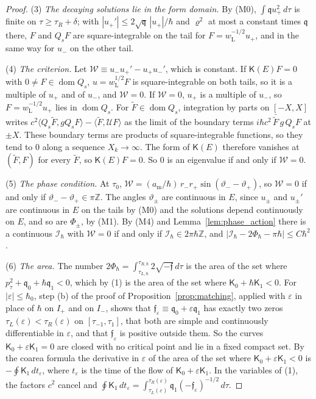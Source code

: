 \documentclass[aps,prd,onecolumn,tightenlines,nofootinbib,notitlepage,11pt,floatfix]{revtex4-2}
\theoremstyle{indentedtheorem}
\begin{document}
\begin{proof}
(3) \emph{The decaying solutions lie in the form domain.} By (M0), $\int\mathfrak{q}u_+^2\,d\tau$ is finite on $\tau\geq\tau_R+\delta$; with $|u_+'|\leq2\sqrt{\mathfrak{q}}\,|u_+|/\hbar$ and $\varrho^2$ at most a constant times $\mathfrak{q}$ there, $F$ and $Q_sF$ are square-integrable on the tail for $F=w_\text{L}^{-1/2}u_+$, and in the same way for $u_-$ on the other tail.

(4) \emph{The criterion.} Let $\mathcal{W}\equiv u_-u_+'-u_+u_-'$, which is constant. If $\mathsf{K}(E)F=0$ with $0\neq F\in\operatorname{dom}Q_s$, $u=w_\text{L}^{1/2}F$ is square-integrable on both tails, so it is a multiple of $u_+$ and of $u_-$, and $\mathcal{W}=0$. If $\mathcal{W}=0$, $u_+$ is a multiple of $u_-$, so $F=w_\text{L}^{-1/2}u_+$ lies in $\operatorname{dom}Q_s$. For $\tilde{F}\in\operatorname{dom}Q_s$, integration by parts on $[-X,X]$ writes $c^2\langle Q_s\tilde{F},gQ_sF\rangle-\langle\tilde{F},\mathcal{U}F\rangle$ as the limit of the boundary terms $i\hbar c^2\,\bar{\tilde{F}}\,g\,Q_sF$ at $\pm X$. These boundary terms are products of square-integrable functions, so they tend to $0$ along a sequence $X_k\to\infty$. The form of $\mathsf{K}(E)$ therefore vanishes at $(\tilde{F},F)$ for every $\tilde{F}$, so $\mathsf{K}(E)F=0$. So $0$ is an eigenvalue if and only if $\mathcal{W}=0$.

(5) \emph{The phase condition.} At $\tau_0$, $\mathcal{W}=(a_\text{m}/\hbar)\,r_-r_+\sin(\vartheta_--\vartheta_+)$, so $\mathcal{W}=0$ if and only if $\vartheta_--\vartheta_+\in\pi\mathbb{Z}$. The angles $\vartheta_\pm$ are continuous in $E$, since $u_\pm$ and $u_\pm'$ are continuous in $E$ on the tails by (M0) and the solutions depend continuously on $E$, and so are $\Phi_\pm$, by (M1). By (M4) and Lemma~\ref{lem:phase_action} there is a continuous $\mathcal{I}_\hbar$ with $\mathcal{W}=0$ if and only if $\mathcal{I}_\hbar\in2\pi\hbar\mathbb{Z}$, and $|\mathcal{I}_\hbar-2\Phi_\hbar-\pi\hbar|\leq C\hbar^2$.

(6) \emph{The area.} The number $2\Phi_\hbar=\int_{\tau_{L,\hbar}}^{\tau_{R,\hbar}}2\sqrt{-\mathfrak{f}}\,d\tau$ is the area of the set where $p_\tau^2+\mathfrak{q}_0+\hbar\mathfrak{q}_1<0$, which by (1) is the area of the set where $\mathsf{K}_0+\hbar\mathsf{K}_1<0$. For $|\varepsilon|\leq\hbar_0$, step (b) of the proof of Proposition~\ref{prop:matching}, applied with $\varepsilon$ in place of $\hbar$ on $I_+$ and on $I_-$, shows that $\mathfrak{f}_\varepsilon\equiv\mathfrak{q}_0+\varepsilon\mathfrak{q}_1$ has exactly two zeros $\tau_L(\varepsilon)<\tau_R(\varepsilon)$ on $[\tau_{-1},\tau_1]$, that both are simple and continuously differentiable in $\varepsilon$, and that $\mathfrak{f}_\varepsilon$ is positive outside them. So the curves $\mathsf{K}_0+\varepsilon\mathsf{K}_1=0$ are closed with no critical point and lie in a fixed compact set. By the coarea formula the derivative in $\varepsilon$ of the area of the set where $\mathsf{K}_0+\varepsilon\mathsf{K}_1<0$ is $-\oint\mathsf{K}_1\,dt_\varepsilon$, where $t_\varepsilon$ is the time of the flow of $\mathsf{K}_0+\varepsilon\mathsf{K}_1$. In the variables of (1), the factors $c^2$ cancel and $\oint\mathsf{K}_1\,dt_\varepsilon=\int_{\tau_L(\varepsilon)}^{\tau_R(\varepsilon)}\mathfrak{q}_1(-\mathfrak{f}_\varepsilon)^{-1/2}\,d\tau$.


\end{proof}
\end{document}
